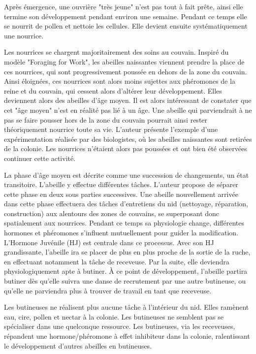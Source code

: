         Après émergence, une ouvrière "très jeune" n'est pas tout à fait prête, ainsi elle termine son développement pendant environ une semaine. Pendant ce temps elle se nourrit de pollen et nettoie les cellules. Elle devient ensuite systématiquement une nourrice. 
        
        Les nourrices se chargent majoritairement des soins au couvain. Inspiré du modèle "Foraging for Work", les abeilles naissantes viennent prendre la place de ces nourrices, qui sont progressivement poussée en dehors de la zone du couvain. Ainsi éloignées, ces nourrices sont alors moins sujettes aux phéromones de la reine et du couvain, qui cessent alors d'altérer leur développement. Elles deviennent alors des abeilles d'âge moyen. Il est alors intéressant de constater que cet "âge moyen" n'est en réalité pas lié à un âge. Une abeille qui parviendrait à ne pas se faire pousser hors de la zone du couvain pourrait ainsi rester théoriquement nourrice toute sa vie. L'auteur présente l'exemple d'une expérimentation réalisée par des biologistes, où les abeilles naissantes sont retirées de la colonie. Les nourrices n'étaient alors pas poussées et ont bien été observées continuer cette activité.
        
        La phase d'âge moyen est décrite comme une succession de changements, un état transitoire. L'abeille y effectue différentes tâches. L'auteur propose de séparer cette phase en deux sous parties successives. Une abeille nouvellement arrivée dans cette phase effectuera des tâches d'entretiens du nid (nettoyage, réparation, construction) aux alentours des zones de couvains, se superposant donc spatialement aux nourrices. Pendant ce temps sa physiologie change, différentes hormones et phéromones s'influent mutuellement pour guider la modification. L'Hormone Juvénile (HJ) est centrale dans ce processus. Avec son HJ grandissante, l'abeille ira se placer de plus en plus proche de la sortie de la ruche, en effectuant notamment la tâche de receveuse. Par la suite, elle deviendra physiologiquement apte à butiner. À ce point de développement, l'abeille partira butiner dès qu'elle suivra une danse de recrutement par une autre butineuse, ou qu'elle ne parviendra plus à trouver de travail en tant que receveuse.
        
        Les butineuses ne réalisent plus aucune tâche à l'intérieur du nid. Elles ramènent eau, cire, pollen et nectar à la colonie. Les butineuses ne semblent pas se spécialiser dans une quelconque ressource. Les butineuses, via les receveuses, répandent une hormone/phéromone à effet inhibiteur dans la colonie, ralentissant le développement d'autres abeilles en butineuses.
        
